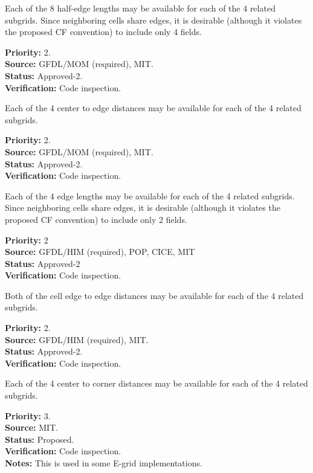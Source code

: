 Each of the 8 half-edge lengths may be available for each of the 4 related
subgrids.  Since neighboring cells share edges, it is desirable (although it violates
the proposed CF convention) to include only 4 fields.
\begin{reqlist}
{\bf Priority:} 2. \\
{\bf Source:} GFDL/MOM (required), MIT. \\
{\bf Status:} Approved-2. \\
{\bf Verification:} Code inspection.
\end{reqlist}

Each of the 4 center to edge distances may be available for each of the 4 related
subgrids.
\begin{reqlist}
{\bf Priority:} 2. \\
{\bf Source:} GFDL/MOM (required), MIT. \\
{\bf Status:} Approved-2. \\
{\bf Verification:} Code inspection.
\end{reqlist}

Each of the 4 edge lengths may be available for each of the 4 related
subgrids.  Since neighboring cells share edges, it is desirable (although it violates
the proposed CF convention) to include only 2 fields.
\begin{reqlist}
{\bf Priority:} 2 \\
{\bf Source:} GFDL/HIM (required), POP, CICE, MIT \\
{\bf Status:} Approved-2 \\
{\bf Verification:} Code inspection.
\end{reqlist}

Both of the cell edge to edge distances may be available for each of the 4 related
subgrids.
\begin{reqlist}
{\bf Priority:} 2. \\
{\bf Source:} GFDL/HIM (required), MIT. \\
{\bf Status:} Approved-2. \\
{\bf Verification:} Code inspection. 
\end{reqlist}

Each of the 4 center to corner distances may be available for each of the 4
related subgrids.
\begin{reqlist}
{\bf Priority:} 3. \\
{\bf Source:} MIT. \\
{\bf Status:} Proposed. \\
{\bf Verification:} Code inspection. \\
{\bf Notes:} This is used in some E-grid implementations.
\end{reqlist}

